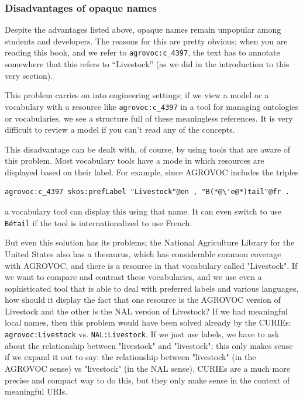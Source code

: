 \subsubsection{Disadvantages of opaque names}

Despite the advantages listed above, opaque names remain unpopular among students 
and developers.  The reasons for this are pretty obvious; when you are reading this 
book, and we refer to \texttt{agrovoc:c\_4397}, the text has to annotate somewhere that this
refers to ``Livestock'' (as we did in the introduction to this very section).   

This problem carries on into engineering settings; if we view a model or a vocabulary with 
a resource like \texttt{agrovoc:c\_4397} in a tool for managing ontologies or 
vocabularies, we see a structure full of these meaningless references.  It 
is very difficult to review a model if you can't read any of the concepts. 

This disadvantage can be dealt with, of course, by using tools that are aware of this 
problem.  Most vocabulary tools have a mode in which resources are displayed based on 
their label.  For example,  since AGROVOC includes the triples


\begin{lstlisting}
agrovoc:c_4397 skos:prefLabel "Livestock"@en , "B(*@\'e@*)tail"@fr .
\end{lstlisting}


a vocabulary tool can display this using that name.  It can even switch to use
\texttt{B\'etail} if the tool is internationalized to use French. 

But even this solution has its problems; the National Agriculture Library for the
United States also has a thesaurus, which has considerable common coverage with 
AGROVOC, and there is a resource in that vocabulary called "Livestock".  If 
we want to compare and contrast these vocabularies, and we use even a 
sophisticated  tool that 
is able to deal with preferred labels and various languages, how should it display the
fact that one resource is the AGROVOC version of Livestock and the other is
the NAL version of Livestock?  If we had meaningful local names, then this
problem would have been solved already by the CURIEs:  
\texttt{agrovoc:Livestock} vs. \texttt{NAL:Livestock}.  If we just use labels, 
we have to ask about the relationship between "livestock" and "livestock"; this only makes sense
if we expand it out to say: the relationship between "livestock" (in the AGROVOC sense) vs "livestock" 
(in the NAL sense).  CURIEs are a much more precise and compact way to do this, but they only make
sense in the context of meaningful URIs. 

